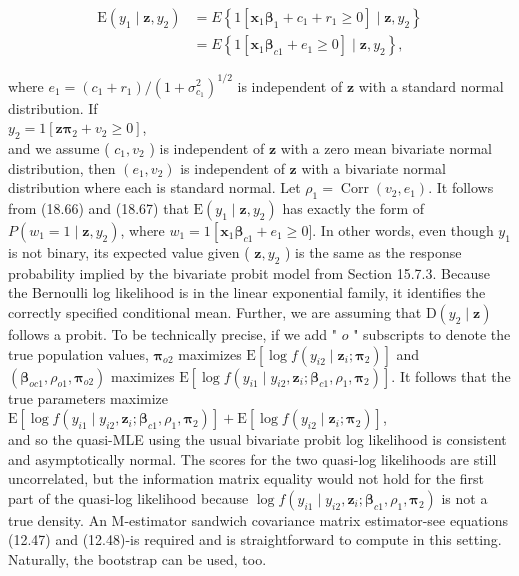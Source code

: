 \documentclass[10pt]{article}
\begin{document}
\begin{align*}
\mathrm{E}\left(y_{1} \mid \mathbf{z}, y_{2}\right) & =E\left\{1\left[\mathbf{x}_{1} \boldsymbol{\beta}_{1}+c_{1}+r_{1} \geq 0\right] \mid \mathbf{z}, y_{2}\right\} \\
& =E\left\{1\left[\mathbf{x}_{1} \boldsymbol{\beta}_{c 1}+e_{1} \geq 0\right] \mid \mathbf{z}, y_{2}\right\}, \tag{18.66}
\end{align*}


where $e_{1}=\left(c_{1}+r_{1}\right) /\left(1+\sigma_{c_{1}}^{2}\right)^{1 / 2}$ is independent of $\mathbf{z}$ with a standard normal distribution. If\\
$y_{2}=1\left[\mathbf{z} \boldsymbol{\pi}_{2}+v_{2} \geq 0\right]$,\\
and we assume ( $c_{1}, v_{2}$ ) is independent of $\mathbf{z}$ with a zero mean bivariate normal distribution, then $\left(e_{1}, v_{2}\right)$ is independent of $\mathbf{z}$ with a bivariate normal distribution where each is standard normal. Let $\rho_{1}=\operatorname{Corr}\left(v_{2}, e_{1}\right)$. It follows from (18.66) and (18.67) that $\mathrm{E}\left(y_{1} \mid \mathbf{z}, y_{2}\right)$ has exactly the form of $P\left(w_{1}=1 \mid \mathbf{z}, y_{2}\right)$, where $w_{1}=1\left[\mathbf{x}_{1} \boldsymbol{\beta}_{c 1}+e_{1} \geq\right. 0]$. In other words, even though $y_{1}$ is not binary, its expected value given ( $\mathbf{z}, y_{2}$ ) is the same as the response probability implied by the bivariate probit model from Section 15.7.3. Because the Bernoulli log likelihood is in the linear exponential family, it identifies the correctly specified conditional mean. Further, we are assuming that $\mathrm{D}\left(y_{2} \mid \mathbf{z}\right)$ follows a probit. To be technically precise, if we add " $o$ " subscripts to denote the true population values, $\boldsymbol{\pi}_{o 2}$ maximizes $\mathrm{E}\left[\log f\left(y_{i 2} \mid \mathbf{z}_{i} ; \boldsymbol{\pi}_{2}\right)\right]$ and $\left(\boldsymbol{\beta}_{o c 1}, \rho_{o 1}, \boldsymbol{\pi}_{o 2}\right)$ maximizes $\mathrm{E}\left[\log f\left(y_{i 1} \mid y_{i 2}, \mathbf{z}_{i} ; \boldsymbol{\beta}_{c 1}, \rho_{1}, \boldsymbol{\pi}_{2}\right)\right]$. It follows that the true parameters maximize\\
$\mathrm{E}\left[\log f\left(y_{i 1} \mid y_{i 2}, \mathbf{z}_{i} ; \boldsymbol{\beta}_{c 1}, \rho_{1}, \boldsymbol{\pi}_{2}\right)\right]+\mathrm{E}\left[\log f\left(y_{i 2} \mid \mathbf{z}_{i} ; \boldsymbol{\pi}_{2}\right)\right]$,\\
and so the quasi-MLE using the usual bivariate probit log likelihood is consistent and asymptotically normal. The scores for the two quasi-log likelihoods are still uncorrelated, but the information matrix equality would not hold for the first part of the quasi-log likelihood because $\log f\left(y_{i 1} \mid y_{i 2}, \mathbf{z}_{i} ; \boldsymbol{\beta}_{c 1}, \rho_{1}, \boldsymbol{\pi}_{2}\right)$ is not a true density. An M-estimator sandwich covariance matrix estimator-see equations (12.47) and (12.48)-is required and is straightforward to compute in this setting. Naturally, the bootstrap can be used, too.
\end{document}
